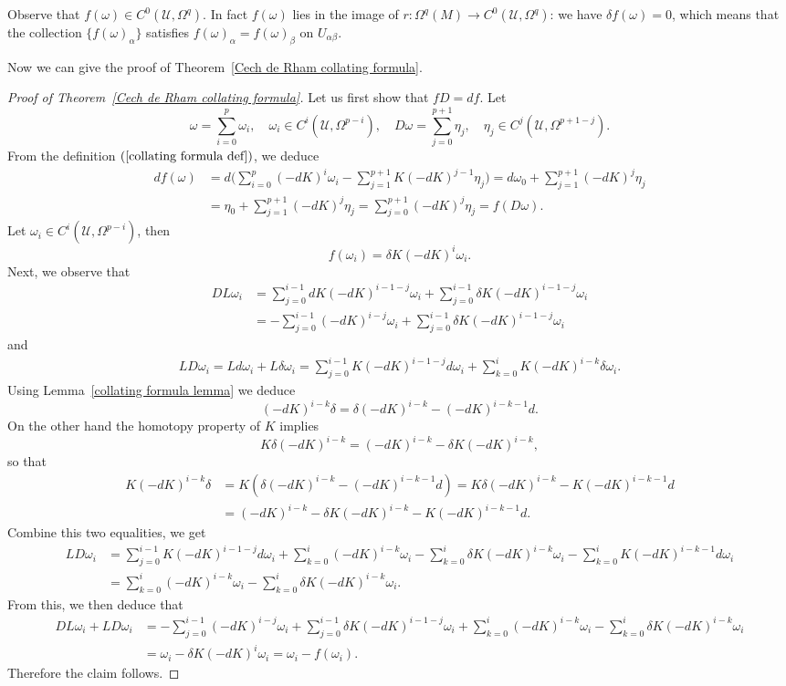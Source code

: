 Observe that $f(\omega)\in C^0(\mathcal{U},\Omega^q)$. In fact $f(\omega)$ lies in the image of $r:\Omega^q(M)\to C^0(\mathcal{U},\Omega^q)$: we have $\delta f(\omega)=0$, 
which means that the collection $\{f(\omega)_\alpha\}$ satisfies $f(\omega)_\alpha=f(\omega)_\beta$ on $U_{\alpha\beta}$.\par
Now we can give the proof of Theorem~\ref{Cech de Rham collating formula}.
\begin{proof}[Proof of Theorem~\ref{Cech de Rham collating formula}]
Let us first show that $fD=df$. Let
\[\omega=\sum_{i=0}^{p}\omega_i,\quad\omega_i\in C^i(\mathcal{U},\Omega^{p-i}),\quad D\omega=\sum_{j=0}^{p+1}\eta_j,\quad\eta_j\in C^{j}(\mathcal{U},\Omega^{p+1-j}).\]
From the definition $(\ref{collating formula def})$, we deduce
\begin{align*}
df(\omega)&=d\Big(\sum_{i=0}^{p}(-dK)^i\omega_i-\sum_{j=1}^{p+1}K(-dK)^{j-1}\eta_j\Big)=d\omega_0+\sum_{j=1}^{p+1}(-dK)^j\eta_j\\
&=\eta_0+\sum_{j=1}^{p+1}(-dK)^j\eta_j=\sum_{j=0}^{p+1}(-dK)^j\eta_j=f(D\omega).
\end{align*}
Let $\omega_i\in C^i(\mathcal{U},\Omega^{p-i})$, then
\[f(\omega_i)=\delta K(-dK)^i\omega_i.\]
Next, we observe that
\begin{align*}
DL\omega_i&=\sum_{j=0}^{i-1}dK(-dK)^{i-1-j}\omega_i+\sum_{j=0}^{i-1}\delta K(-dK)^{i-1-j}\omega_i\\
&=-\sum_{j=0}^{i-1}(-dK)^{i-j}\omega_i+\sum_{j=0}^{i-1}\delta K(-dK)^{i-1-j}\omega_i
\end{align*}
and
\begin{align*}
LD\omega_i=Ld\omega_i+L\delta\omega_i=\sum_{j=0}^{i-1}K(-dK)^{i-1-j}d\omega_i+\sum_{k=0}^{i}K(-dK)^{i-k}\delta\omega_i.
\end{align*}
Using Lemma~\ref{collating formula lemma} we deduce
\[(-dK)^{i-k}\delta=\delta(-dK)^{i-k}-(-dK)^{i-k-1}d.\]
On the other hand the homotopy property of $K$ implies
\[K\delta(-dK)^{i-k}=(-dK)^{i-k}-\delta K(-dK)^{i-k},\]
so that
\begin{align*}
K(-dK)^{i-k}\delta&=K(\delta(-dK)^{i-k}-(-dK)^{i-k-1}d)=K\delta(-dK)^{i-k}-K(-dK)^{i-k-1}d\\
&=(-dK)^{i-k}-\delta K(-dK)^{i-k}-K(-dK)^{i-k-1}d.
\end{align*}
Combine this two equalities, we get
\begin{align*}
LD\omega_i&=\sum_{j=0}^{i-1}K(-dK)^{i-1-j}d\omega_i+\sum_{k=0}^{i}(-dK)^{i-k}\omega_i-\sum_{k=0}^{i}\delta K(-dK)^{i-k}\omega_i-\sum_{k=0}^{i}K(-dK)^{i-k-1}d\omega_i\\
&=\sum_{k=0}^{i}(-dK)^{i-k}\omega_i-\sum_{k=0}^{i}\delta K(-dK)^{i-k}\omega_i.
\end{align*}
From this, we then deduce that
\begin{align*}
DL\omega_i+LD\omega_i&=-\sum_{j=0}^{i-1}(-dK)^{i-j}\omega_i+\sum_{j=0}^{i-1}\delta K(-dK)^{i-1-j}\omega_i+\sum_{k=0}^{i}(-dK)^{i-k}\omega_i-\sum_{k=0}^{i}\delta K(-dK)^{i-k}\omega_i\\
&=\omega_i-\delta K(-dK)^i\omega_i=\omega_i-f(\omega_i).
\end{align*}
Therefore the claim follows.
\end{proof}
